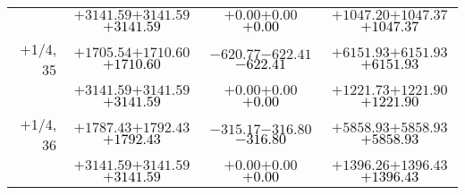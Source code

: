 \documentclass[compress]{beamer}
\begin{document}
\begin{frame}
{\begin{tabular}{r | c | c | c}
           & $+3141.59$\hspace{0.1 cm}$+3141.59$\hspace{0.1 cm}\textcolor{black}{$+3141.59$} & $+0.00$\hspace{0.1 cm}$+0.00$\hspace{0.1 cm}\textcolor{black}{$+0.00$} & $+1047.20$\hspace{0.1 cm}$+1047.37$\hspace{0.1 cm}\textcolor{black}{$+1047.37$} \\
$+$1/4, 35 & $+1705.54$\hspace{0.1 cm}$+1710.60$\hspace{0.1 cm}\textcolor{black}{$+1710.60$} & $-620.77$\hspace{0.1 cm}$-622.41$\hspace{0.1 cm}\textcolor{black}{$-622.41$} & $+6151.93$\hspace{0.1 cm}$+6151.93$\hspace{0.1 cm}\textcolor{black}{$+6151.93$} \\
           & $+3141.59$\hspace{0.1 cm}$+3141.59$\hspace{0.1 cm}\textcolor{black}{$+3141.59$} & $+0.00$\hspace{0.1 cm}$+0.00$\hspace{0.1 cm}\textcolor{black}{$+0.00$} & $+1221.73$\hspace{0.1 cm}$+1221.90$\hspace{0.1 cm}\textcolor{black}{$+1221.90$} \\
$+$1/4, 36 & $+1787.43$\hspace{0.1 cm}$+1792.43$\hspace{0.1 cm}\textcolor{black}{$+1792.43$} & $-315.17$\hspace{0.1 cm}$-316.80$\hspace{0.1 cm}\textcolor{black}{$-316.80$} & $+5858.93$\hspace{0.1 cm}$+5858.93$\hspace{0.1 cm}\textcolor{black}{$+5858.93$} \\
           & $+3141.59$\hspace{0.1 cm}$+3141.59$\hspace{0.1 cm}\textcolor{black}{$+3141.59$} & $+0.00$\hspace{0.1 cm}$+0.00$\hspace{0.1 cm}\textcolor{black}{$+0.00$} & $+1396.26$\hspace{0.1 cm}$+1396.43$\hspace{0.1 cm}\textcolor{black}{$+1396.43$} \\
\end{tabular}}
\end{frame}
\end{document}
